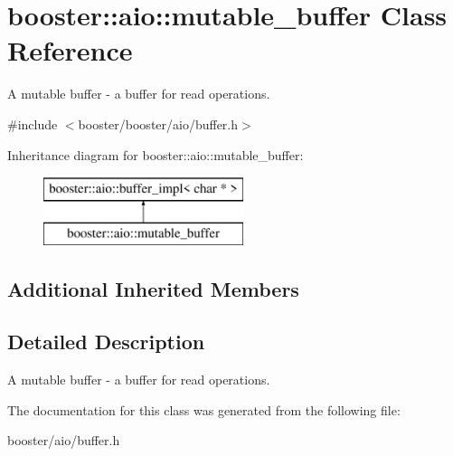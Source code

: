 \section{booster\-:\-:aio\-:\-:mutable\-\_\-buffer Class Reference}
\label{classbooster_1_1aio_1_1mutable__buffer}


A mutable buffer -\/ a buffer for read operations.  




{\ttfamily \#include $<$booster/booster/aio/buffer.\-h$>$}

Inheritance diagram for booster\-:\-:aio\-:\-:mutable\-\_\-buffer\-:\begin{figure}[H]
\begin{center}
\leavevmode
\includegraphics[height=2.000000cm]{classbooster_1_1aio_1_1mutable__buffer}
\end{center}
\end{figure}
\subsection*{Additional Inherited Members}


\subsection{Detailed Description}
A mutable buffer -\/ a buffer for read operations. 

The documentation for this class was generated from the following file\-:\begin{DoxyCompactItemize}
\item 
booster/aio/buffer.\-h\end{DoxyCompactItemize}
